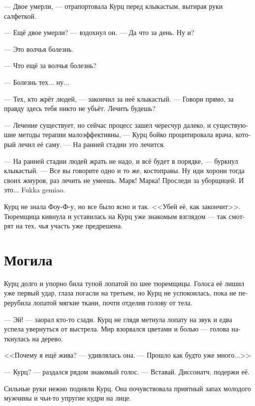 \documentclass[a4paper,12pt,fleqn]{book}\usepackage{polyglossia}\setdefaultlanguage[babelshorthands=true]{russian}\setotherlanguage{english}\defaultfontfeatures{Ligatures=TeX,Mapping=tex-text}\usepackage{xcolor}\newcommand{\ml}[3]{#2}
\begin{document}
--- Двое умерли, --- отрапортовала Курц перед клыкастым, вытирая руки салфеткой.

--- Ещё двое умерли? --- вздохнул он. --- Да что за день.
Ну и?

\ml{$0$}
{--- Это волчья болезнь.}
{``It's wolf sickness.''}

\ml{$0$}
{--- Что ещё за волчья болезнь?}
{``What the fuck is wolf sickness?''}

--- Болезнь тех... ну...

--- Тех, кто жрёт людей, --- закончил за неё клыкастый.
\ml{$0$}
{--- Говори прямо, за правду здесь тебя никто не убьёт.}
{``Speak your mind, no one will kill you for the truth here.}
Лечить будешь?

--- Лечение существует, но сейчас процесс зашел чересчур далеко, и существуюшие методы терапии малоэффективны, --- Курц бойко процитировала врача, который лечил её саму.
--- На ранней стадии это лечится.

--- На ранней стадии людей жрать не надо, и всё будет в порядке, --- буркнул клыкастый.
--- Все вы говорите одно и то же, костоправы.
Ну иди хорони тогда своих жмуров, раз лечить не умеешь.
Марк!
Марка!
Проследи за уборщицей.
И это... Fukka gemiao.

Курц не знала Фоу-Ф-у, но все было ясно и так.
<<Убей её, как закончит>>.
Тюремщица кивнула и уставилась на Курц уже знакомым взглядом --- так смотрят на тех, чья участь уже предрешена.

\section{Могила}

Курц долго и упорно била тупой лопатой по шее тюремщицы.
Голоса её лишил уже первый удар, глаза погасли на третьем, но Курц не успокоилась, пока не перерубила лопатой мягкие ткани, почти отделив голову от тела.

--- Эй! --- заорал кто-то сзади.
Курц не глядя метнула лопату на звук и едва успела увернуться от выстрела.
Мир взорвался цветами и болью --- голова наткнулась на дерево.

<<Почему я ещё жива? --- удивлялась она.
--- Прошло как будто уже много...>>

--- Курц? --- раздался рядом знакомый голос.
\ml{$0$}
{--- Вставай.}
{``Get up.}
\ml{$0$}
{Диссонатч, подержи её.}
{Dissonatch, take care of her.''}

Сильные руки нежно подняли Курц.
Она почувствовала приятный запах молодого мужчины и чьи-то упругие кудри на лице.
\end{document}
